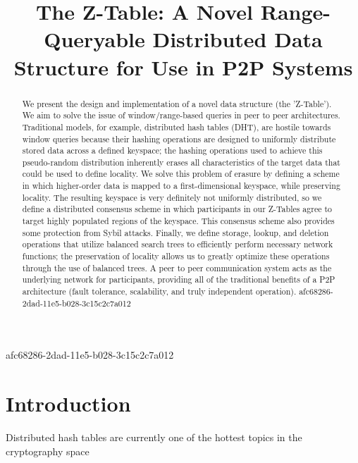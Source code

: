 \documentclass[12pt]{article}
\title{The Z-Table: A Novel Range-Queryable Distributed Data Structure for Use in P2P Systems}
\begin{document}
\maketitle
afc68286-2dad-11e5-b028-3c15c2c7a012
\begin{abstract}
We present the design and implementation of a novel data structure (the 'Z-Table'). We aim to solve the issue of window/range-based queries in peer to peer architectures. Traditional models, for example,  distributed hash tables (DHT), are hostile towards window queries because their hashing operations are designed to uniformly distribute stored data across a defined keyspace; the hashing operations used to achieve this pseudo-random distribution inherently erases all characteristics of the target data that could be used to define locality. We solve this problem of erasure by defining a scheme in which higher-order data is mapped to a first-dimensional keyspace, while preserving locality. The resulting keyspace is very definitely not uniformly distributed, so we define a distributed consensus scheme in which participants in our Z-Tables agree to target highly populated regions of the keyspace. This consensus scheme also provides some protection from Sybil attacks. Finally, we define storage, lookup, and deletion operations that utilize balanced search trees to efficiently perform necessary network functions; the preservation of locality allows us to greatly optimize these operations through the use of balanced trees. A peer to peer communication system acts as the underlying network for participants, providing all of the traditional benefits of a P2P architecture (fault tolerance, scalability, and truly independent operation).
afc68286-2dad-11e5-b028-3c15c2c7a012\end{abstract}


\newpage
\section{Introduction}
Distributed hash tables are currently one of the hottest topics in the cryptography space~\cite{Stoica:2001dj,Rowstron:2001ea,Ratnasamy:2001wn}

\printbibliography
\end{document}
